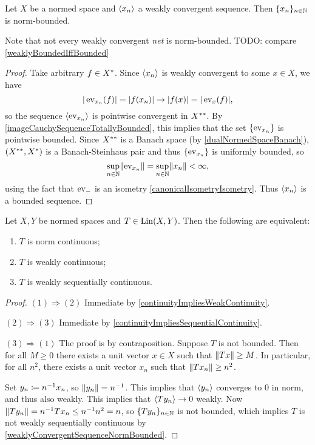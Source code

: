 \begin{proposition} \label{weaklyConvergentSequenceNormBounded}
Let $X$ be a normed space and $\left\langle x_n \right\rangle$ a weakly convergent sequence. Then $\{x_n\}_{n\in \mathbb{N}}$ is norm-bounded.
\end{proposition}
Note that not every weakly convergent \emph{net} is norm-bounded. TODO: compare \ref{weaklyBoundedIffBounded}
\begin{proof}
Take arbitrary $f\in {X}^*$. Since $\left\langle x_n \right\rangle$ is weakly convergent to some $x\in X$, we have
\[ |\operatorname{ev}_{x_n}(f)| = |f(x_n)| \to |f(x)| = |\operatorname{ev}_x(f)|, \]
so the sequence $\left\langle \operatorname{ev}_{x_n} \right\rangle$ is pointwise convergent in ${X}^{**}$. By \ref{imageCauchySequenceTotallyBounded}, this implies that the set $\{\operatorname{ev}_{x_n}\}$ is pointwise bounded. Since ${X}^{**}$ is a Banach space (by \ref{dualNormedSpaceBanach}), $({X}^{**}, {X}^*)$ is a Banach-Steinhaus pair and thus $\{\operatorname{ev}_{x_n}\}$ is uniformly bounded, so
\[ \sup_{n\in \mathbb{N}}\lVert\operatorname{ev}_{x_n}\rVert = \sup_{n\in \mathbb{N}}\lVert x_n\rVert < \infty, \]
using the fact that $\operatorname{ev}_-$ is an isometry \ref{canonicalIsometryIsometry}. Thus $\left\langle x_n \right\rangle$ is a bounded sequence.
\end{proof}

\begin{proposition}
Let $X,Y$ be normed spaces and $T\in \operatorname{Lin}(X,Y)$. Then the following are equivalent:
\begin{enumerate}
\item $T$ is norm continuous;
\item $T$ is weakly continuous;
\item $T$ is weakly sequentially continuous.
\end{enumerate}
\end{proposition}
\begin{proof}
$(1) \Rightarrow (2)$ Immediate by \ref{continuityImpliesWeakContinuity}.

$(2) \Rightarrow (3)$ Immediate by \ref{continuityImpliesSequentialContinuity}.

$(3) \Rightarrow (1)$ The proof is by contraposition. Suppose $T$ is not bounded. Then for all $M\geq 0$ there exists a unit vector $x\in X$ such that $\lVert Tx\rVert \geq M$. In particular, for all $n^2$, there exists a unit vector $x_n$ such that $\lVert Tx_n\rVert \geq n^2$.

Set $y_n \coloneqq n^{-1}x_n$, so $\lVert y_n\rVert = n^{-1}$. This implies that $\left\langle y_n \right\rangle$ converges to $0$ in norm, and thus also weakly. This implies that $\left\langle Ty_n \right\rangle \to 0$ weakly. Now $\lVert Ty_n\rVert = n^{-1}Tx_n \leq n^{-1}n^2 = n$, so $\{Ty_n\}_{n\in\mathbb{N}}$ is not bounded, which implies $T$ is not weakly sequentially continuous by \ref{weaklyConvergentSequenceNormBounded}.
\end{proof}

